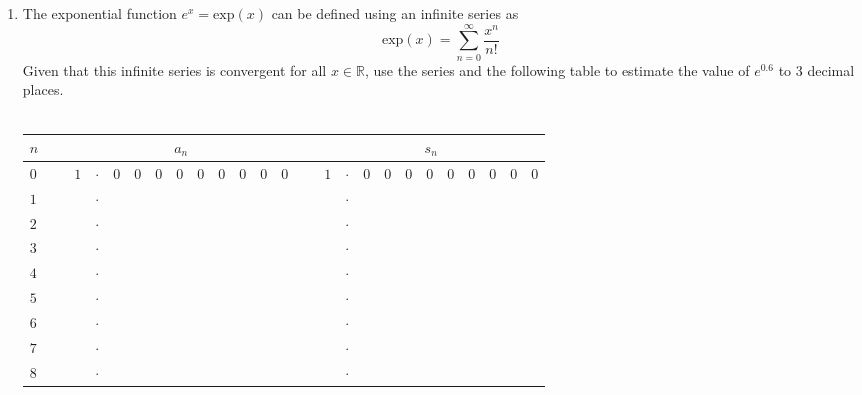 \documentclass[11pt,a4paper,titlepage,oneside,openany]{article}
\numberwithin{equation}{section}
\numberwithin{algorithm}{section}
\numberwithin{figure}{section}
\numberwithin{table}{section}
\newcommand{\mb}{\mathbb}
\begin{document}
\begin{enumerate}
\item The exponential function $e^x=\text{exp}(x)$ can be defined using an infinite series as
\begin{equation*}
\text{exp}(x)=\sum_{n=0}^\infty \frac{x^n}{n!}
\end{equation*}
Given that this infinite series is convergent for all $x \in \mb{R}$, use the series and the following table to estimate the value of $e^{0.6}$ to $3$ decimal places.
\\
\\

\begin{tabular}{|l|c|c:c:c:c:c:c:c:c:c:c:c|c|c:c:c:c:c:c:c:c:c:c:c|}\hline
$n$ & \ &  & \ &  \\\hline
$0$ & \ &
$1$ & $\cdot$ & $0$ & $0$ & $0$ & $0$ & $0$ & $0$ & $0$ & $0$ & $0$ & \ &
$1$ & $\cdot$ & $0$ & $0$ & $0$ & $0$ & $0$ & $0$ & $0$ & $0$ & $0$ \\ \hline
$1$ & \ &
 & $\cdot$ &  &  &  &  &  &  &  &  &  & \ &
 & $\cdot$ &  &  &  &  &  &  &  &  &  \\ \hline
$2$ & \ &
 & $\cdot$ &  &  &  &  &  &  &  &  &  & \ &
 & $\cdot$ &  &  &  &  &  &  &  &  &  \\ \hline
$3$ & \ &
 & $\cdot$ &  &  &  &  &  &  &  &  &  & \ &
 & $\cdot$ &  &  &  &  &  &  &  &  &  \\ \hline
$4$ & \ &
 & $\cdot$ &  &  &  &  &  &  &  &  &  & \ &
 & $\cdot$ &  &  &  &  &  &  &  &  &  \\ \hline
$5$ & \ &
 & $\cdot$ &  &  &  &  &  &  &  &  &  & \ &
 & $\cdot$ &  &  &  &  &  &  &  &  &  \\ \hline
$6$ & \ &
 & $\cdot$ &  &  &  &  &  &  &  &  &  & \ &
 & $\cdot$ &  &  &  &  &  &  &  &  &  \\ \hline
$7$ & \ &
 & $\cdot$ &  &  &  &  &  &  &  &  &  & \ &
 & $\cdot$ &  &  &  &  &  &  &  &  &  \\ \hline
$8$ & \ &
 & $\cdot$ &  &  &  &  &  &  &  &  &  & \ &
 & $\cdot$ &  &  &  &  &  &  &  &  &  \\ \hline
\end{tabular}

\end{enumerate}
\pagebreak
\end{document}
